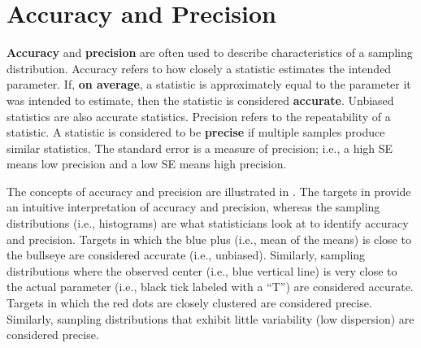 \documentclass[10pt,openany]{book}\usepackage[]{graphicx}\usepackage[]{color}
\begin{document}
\section{Accuracy and Precision}
\textbf{Accuracy} and \textbf{precision} are often used to describe characteristics of a sampling distribution. Accuracy refers to how closely a statistic estimates the intended parameter. If, \textbf{on average}, a statistic is approximately equal to the parameter it was intended to estimate, then the statistic is considered \textbf{accurate}. Unbiased statistics are also accurate statistics. Precision refers to the repeatability of a statistic. A statistic is considered to be \textbf{precise} if multiple samples produce similar statistics. The standard error is a measure of precision; i.e., a high SE means low precision and a low SE means high precision.

The concepts of accuracy and precision are illustrated in . The targets in  provide an intuitive interpretation of accuracy and precision, whereas the sampling distributions (i.e., histograms) are what statisticians look at to identify accuracy and precision. Targets in which the blue plus (i.e., mean of the means) is close to the bullseye are considered accurate (i.e., unbiased). Similarly, sampling distributions where the observed center (i.e., blue vertical line) is very close to the actual parameter (i.e., black tick labeled with a ``T'') are considered accurate. Targets in which the red dots are closely clustered are considered precise. Similarly, sampling distributions that exhibit little variability (low dispersion) are considered precise.
\end{document}
